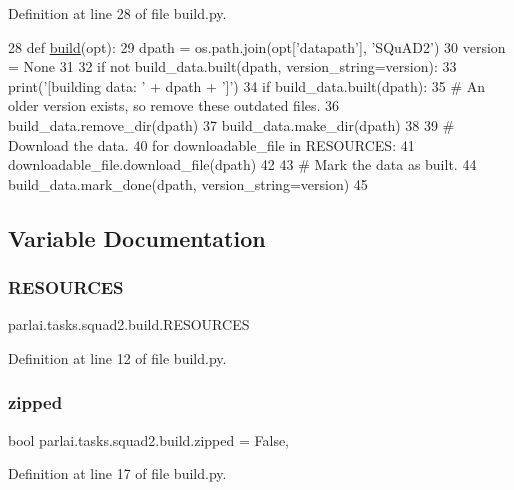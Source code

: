 Definition at line 28 of file build.\+py.


\begin{DoxyCode}
28 \textcolor{keyword}{def }\hyperlink{namespacedialog__babi__feedback_1_1build_a7a9d289f7493a5ded13c4b7f071b6184}{build}(opt):
29     dpath = os.path.join(opt[\textcolor{stringliteral}{'datapath'}], \textcolor{stringliteral}{'SQuAD2'})
30     version = \textcolor{keywordtype}{None}
31 
32     \textcolor{keywordflow}{if} \textcolor{keywordflow}{not} build\_data.built(dpath, version\_string=version):
33         print(\textcolor{stringliteral}{'[building data: '} + dpath + \textcolor{stringliteral}{']'})
34         \textcolor{keywordflow}{if} build\_data.built(dpath):
35             \textcolor{comment}{# An older version exists, so remove these outdated files.}
36             build\_data.remove\_dir(dpath)
37         build\_data.make\_dir(dpath)
38 
39         \textcolor{comment}{# Download the data.}
40         \textcolor{keywordflow}{for} downloadable\_file \textcolor{keywordflow}{in} RESOURCES:
41             downloadable\_file.download\_file(dpath)
42 
43         \textcolor{comment}{# Mark the data as built.}
44         build\_data.mark\_done(dpath, version\_string=version)
45 \end{DoxyCode}


\subsection{Variable Documentation}
\mbox{\label{namespaceparlai_1_1tasks_1_1squad2_1_1build_a7ec1a941e12afae17dd74dc22fd2538e}} 
\subsubsection{\texorpdfstring{R\+E\+S\+O\+U\+R\+C\+ES}{RESOURCES}}
{\footnotesize\ttfamily parlai.\+tasks.\+squad2.\+build.\+R\+E\+S\+O\+U\+R\+C\+ES}



Definition at line 12 of file build.\+py.

\mbox{\label{namespaceparlai_1_1tasks_1_1squad2_1_1build_afd71a1a5972c8d7c6a601b21b0629164}} 
\subsubsection{\texorpdfstring{zipped}{zipped}}
{\footnotesize\ttfamily bool parlai.\+tasks.\+squad2.\+build.\+zipped = False,}



Definition at line 17 of file build.\+py.

